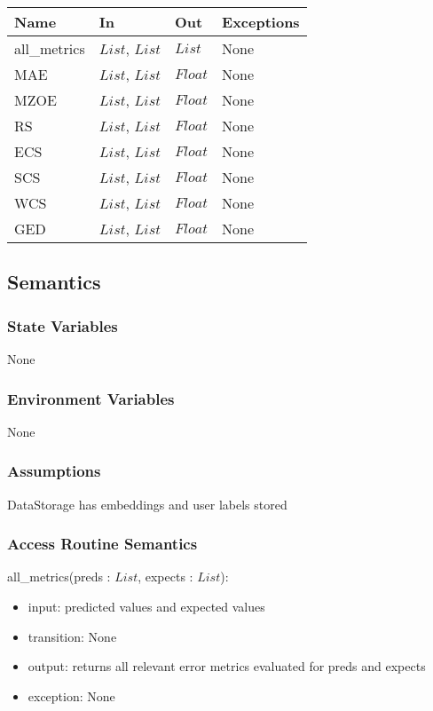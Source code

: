 \documentclass[12pt, titlepage]{article}
\begin{document}
\begin{center}
\begin{tabular}{p{3cm} p{5cm} p{3cm} p{3cm}}
\hline
\textbf{Name} & \textbf{In} & \textbf{Out} & \textbf{Exceptions} \\
\hline
all\_metrics & $List$, $List$ & $List$ & None \\
MAE & $List$, $List$ & $Float$ & None \\
MZOE & $List$, $List$ & $Float$ & None \\
RS & $List$, $List$ & $Float$ & None \\
ECS & $List$, $List$ & $Float$ & None \\
SCS & $List$, $List$ & $Float$ & None \\
WCS & $List$, $List$ & $Float$ & None \\
GED & $List$, $List$ & $Float$ & None \\
\hline
\end{tabular}
\end{center}

\subsection{Semantics}

\subsubsection{State Variables}

None

\subsubsection{Environment Variables}

None

\subsubsection{Assumptions}

DataStorage has embeddings and user labels stored

\subsubsection{Access Routine Semantics}

\noindent all\_metrics(preds : $List$, expects : $List$):
\begin{itemize}
\item input: predicted values and expected values
\item transition: None
\item output: returns all relevant error metrics evaluated for preds and expects
\item exception: None
\end{itemize}
\end{document}
